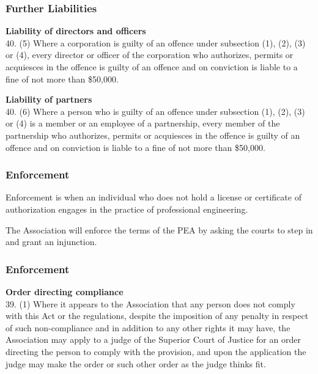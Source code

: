 \begin{frame}
\frametitle{Further Liabilities}

\textbf{Liability of directors and officers}\\
	40. (5)  Where a corporation is guilty of an offence under subsection (1), (2), (3) or (4), every director or officer of the corporation who authorizes, permits or acquiesces in the offence is guilty of an offence and on conviction is liable to a fine of not more than \$50,000.

\textbf{Liability of partners}\\
	40. (6)  Where a person who is guilty of an offence under subsection (1), (2), (3) or (4) is a member or an employee of a partnership, every member of the partnership who authorizes, permits or acquiesces in the offence is guilty of an offence and on conviction is liable to a fine of not more than \$50,000.


\end{frame}



\begin{frame}
\frametitle{Enforcement}

Enforcement is when an individual who does not hold a license or certificate of authorization engages in the practice of professional engineering. 

The Association will enforce the terms of the PEA by asking the courts to step in and grant an injunction.

\end{frame}



\begin{frame}
\frametitle{Enforcement}

\textbf{Order directing compliance}\\
	39. (1) Where it appears to the Association that any person does not comply with this Act or the regulations, despite the imposition of any penalty in respect of such non-compliance and in addition to any other rights it may have, the Association may apply to a judge of the Superior Court of Justice for an order directing the person to comply with the provision, and upon the application the judge may make the order or such other order as the judge thinks fit.


\end{frame}



